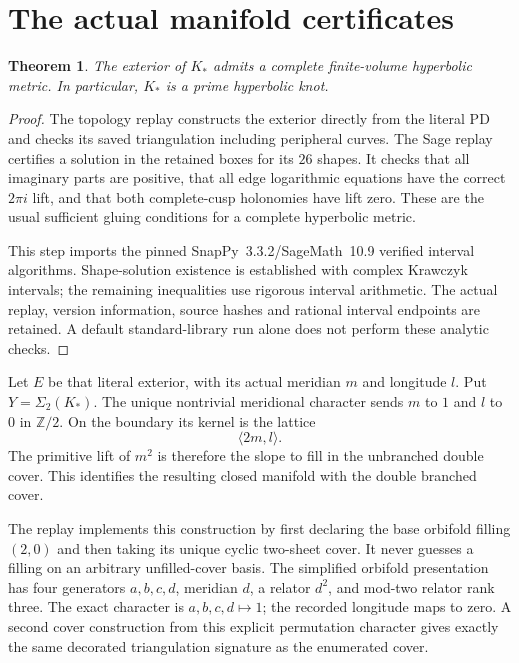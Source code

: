 \documentclass[11pt]{article}
\newtheorem{theorem}{Theorem}
\begin{document}
\section{The actual manifold certificates}

\begin{theorem}\label{thm:hyperbolic}
The exterior of $K_*$ admits a complete finite-volume hyperbolic
metric. In particular, $K_*$ is a prime hyperbolic knot.
\end{theorem}
\begin{proof}
The topology replay constructs the exterior directly from the literal
PD and checks its saved triangulation including peripheral curves.
The Sage replay certifies a solution in the retained boxes for its
$26$ shapes. It checks that all imaginary parts are positive, that
all edge logarithmic equations have the correct $2\pi i$ lift, and
that both complete-cusp holonomies have lift zero. These are the
usual sufficient gluing conditions for a complete hyperbolic metric.

This step imports the pinned SnapPy~3.3.2/SageMath~10.9 verified
interval algorithms. Shape-solution existence is established with
complex Krawczyk intervals; the remaining inequalities use rigorous
interval arithmetic. The actual replay, version information,
source hashes and rational interval endpoints are retained. A default
standard-library run alone does not perform these analytic checks.
\end{proof}

Let $E$ be that literal exterior, with its actual meridian $m$ and
longitude $l$. Put $Y=\Sigma_2(K_*)$.
The unique nontrivial meridional character sends $m$ to $1$ and $l$
to $0$ in $\mathbb Z/2$. On the boundary its kernel is the lattice
\[
                         \langle 2m,l\rangle.
\]
The primitive lift of $m^2$ is therefore the slope to fill in the
unbranched double cover. This identifies the resulting closed manifold
with the double branched cover.

The replay implements this construction by first declaring the base
orbifold filling $(2,0)$ and then taking its unique cyclic two-sheet
cover. It never guesses a filling on an arbitrary unfilled-cover basis.
The simplified orbifold presentation has four generators $a,b,c,d$,
meridian $d$, a relator $d^2$, and mod-two relator rank three.
The exact character is $a,b,c,d\mapsto1$; the recorded longitude maps
to zero. A second cover construction from this explicit permutation
character gives exactly the same decorated triangulation signature
as the enumerated cover.
\end{document}
